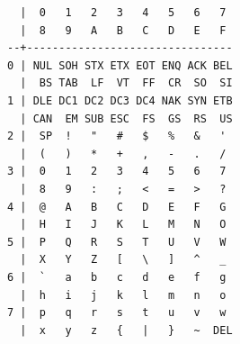 \begin{verbatim}
  |  0   1   2   3   4   5   6   7 
  |  8   9   A   B   C   D   E   F 
--+--------------------------------
0 | NUL SOH STX ETX EOT ENQ ACK BEL
  |  BS TAB  LF  VT  FF  CR  SO  SI
1 | DLE DC1 DC2 DC3 DC4 NAK SYN ETB
  | CAN  EM SUB ESC  FS  GS  RS  US
2 |  SP  !   "   #   $   %   &   ' 
  |  (   )   *   +   ,   -   .   / 
3 |  0   1   2   3   4   5   6   7 
  |  8   9   :   ;   <   =   >   ? 
4 |  @   A   B   C   D   E   F   G 
  |  H   I   J   K   L   M   N   O 
5 |  P   Q   R   S   T   U   V   W 
  |  X   Y   Z   [   \   ]   ^   _ 
6 |  `   a   b   c   d   e   f   g 
  |  h   i   j   k   l   m   n   o 
7 |  p   q   r   s   t   u   v   w 
  |  x   y   z   {   |   }   ~  DEL
\end{verbatim}